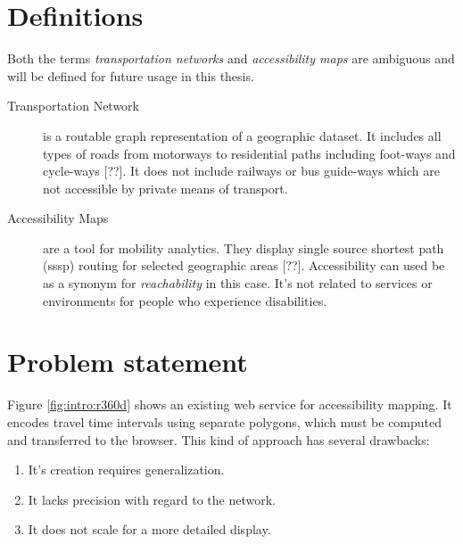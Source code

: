   \section{Definitions}
    \label{sec:intro:def}

    Both the terms \textit{transportation networks} and \textit{accessibility
    maps} are ambiguous and will be defined for future usage in this
    thesis.\par

    \begin{description}
      \item[Transportation Network] is a routable graph representation of a
        geographic dataset.
        It includes all types of roads from motorways to residential paths
        including foot-ways and cycle-ways [??]. It does not include railways or
        bus guide-ways which are not accessible by private means of transport.
      \item[Accessibility Maps] are a tool for mobility analytics. They display
        single source shortest path (\acrshort{sssp}) routing for selected
        geographic areas [??]. Accessibility can used be as a synonym for
        \textit{reachability} in this case. It's not related to services or
        environments for people who experience disabilities.


    \end{description}

  \section{Problem statement}
    \label{sec:intro:probl}

    Figure \ref{fig:intro:r360d} shows an existing web service for accessibility
    mapping. It encodes travel time intervals using separate polygons, which
    must be computed and transferred to the browser. This kind of approach has
    several drawbacks:\par

    \begin{enumerate}[\label=({D}1)]
      \item It's creation requires generalization.
      \item It lacks precision with regard to the network.
      \item It does not scale for a more detailed display.
    \end{enumerate}

